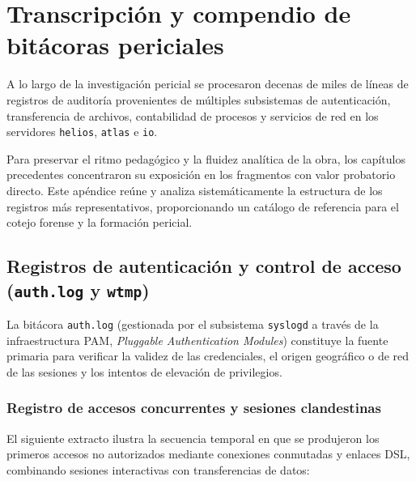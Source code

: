 \chapter{Transcripción y compendio de bitácoras periciales}
\label{apendice:bitacoras}

A lo largo de la investigación pericial se procesaron decenas de miles de líneas de registros de auditoría provenientes de múltiples subsistemas de autenticación, transferencia de archivos, contabilidad de procesos y servicios de red en los servidores \texttt{helios}, \texttt{atlas} e \texttt{io}.

Para preservar el ritmo pedagógico y la fluidez analítica de la obra, los capítulos precedentes concentraron su exposición en los fragmentos con valor probatorio directo. Este apéndice reúne y analiza sistemáticamente la estructura de los registros más representativos, proporcionando un catálogo de referencia para el cotejo forense y la formación pericial.

\section{Registros de autenticación y control de acceso (\texttt{auth.log} y \texttt{wtmp})}

La bitácora \texttt{auth.log} (gestionada por el subsistema \texttt{syslogd} a través de la infraestructura PAM, \textit{Pluggable Authentication Modules}) constituye la fuente primaria para verificar la validez de las credenciales, el origen geográfico o de red de las sesiones y los intentos de elevación de privilegios.

\subsection{Registro de accesos concurrentes y sesiones clandestinas}

El siguiente extracto ilustra la secuencia temporal en que se produjeron los primeros accesos no autorizados mediante conexiones conmutadas y enlaces DSL, combinando sesiones interactivas con transferencias de datos:


